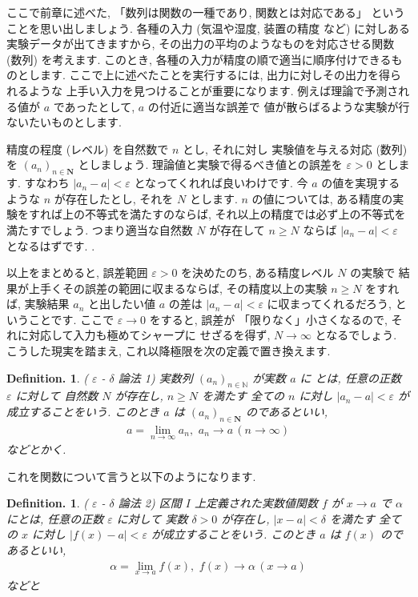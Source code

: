 \documentclass[openany, a4paper, oneside]{jsbook}
\theoremstyle{break}
\theoremstyle{breakdefn}
\newtheorem{defn}[thm]{Definition.}
\newcommand{\vep}{\varepsilon}
\begin{document}
ここで前章に述べた, 「数列は関数の一種であり, 関数とは対応である」
ということを思い出しましょう.
各種の入力 (気温や湿度, 装置の精度
など) に対しある実験データが出てきますから, その出力の平均のようなものを対応させる関数 (数列) を考えます.
このとき, 各種の入力が精度の順で適当に順序付けできるものとします.
ここで上に述べたことを実行するには, 出力に対しその出力を得られるような
上手い入力を見つけることが重要になります.
例えば理論で予測される値が $a$ であったとして,
 $a$ の付近に適当な誤差で
値が散らばるような実験が行ないたいものとします.

精度の程度 (レベル) を自然数で $n$ とし, それに対し
実験値を与える対応 (数列) を $(a_n)_{n \in \bm{N}}$ としましょう.
理論値と実験で得るべき値との誤差を $\varepsilon >0$ とします. すなわち
 $|a_n -a| < \varepsilon$ となってくれれば良いわけです.
今 $a$ の値を実現するような $n$ が存在したとし, それを $N$ とします.
 $n$ の値については, ある精度の実験をすれば上の不等式を満たすのならば,
それ以上の精度では必ず上の不等式を満たすでしょう.
つまり適当な自然数 $N$ が存在して $n \geq N$ ならば
 $|a_n -a|<\varepsilon$ となるはずです. .

以上をまとめると,
誤差範囲 $\varepsilon >0$ を決めたのち, ある精度レベル $N$ の実験で
結果が上手くその誤差の範囲に収まるならば,
その精度以上の実験 $n \geq N$ をすれば, 実験結果 $a_n$ と出したい値 $a$
の差は $|a_n -a| < \varepsilon$ に収まってくれるだろう,
ということです.
ここで $\varepsilon \to 0$ をすると, 誤差が
「限りなく」小さくなるので, それに対応して入力も極めてシャープに
せざるを得ず,  $N \to \infty$ となるでしょう.
こうした現実を踏まえ, これ以降極限を次の定義で置き換えます.
\begin{defn}( $\vep$ - $\delta$ 論法 1)\index{いぷしろんでるたろんぽう@ $\vep$ - $\delta$ 論法}
実数列 $(a_n)_{n \in \mathbb{N}}$ が実数 $a$ に
とは, 任意の正数 $\varepsilon$ に対して
自然数 $N$ が存在し,  $n\geq N$ を満たす
全ての $n$ に対し $|a_n-a|<\varepsilon$ が成立することをいう.
このとき $a$ は $(a_n)_{n \in \bm{N}}$ のであるといい,
\begin{align}
    a = \lim_{n \to \infty}a_n ,\,\, a_n \to a \, (n \to \infty)
\end{align}
などとかく.
\end{defn}

これを関数について言うと以下のようになります.
\begin{defn}( $\vep$ - $\delta$ 論法 2)
区間 $I$ 上定義された実数値関数 $f$ が $x \to a$
で $\alpha$ にとは, 任意の正数 $\varepsilon$ に対して
実数 $\delta >0$ が存在し,  $|x-a|<\delta$ を満たす
全ての $x$ に対し $|f (x)-a|<\varepsilon$ が成立することをいう.
このとき $a$ は $f (x)$ のであるといい,
\begin{align}
    \alpha = \lim_{x \to a}f (x) ,\,\, f (x) \to \alpha \, (x \to a)
\end{align}
などと
\end{defn}
\end{document}
